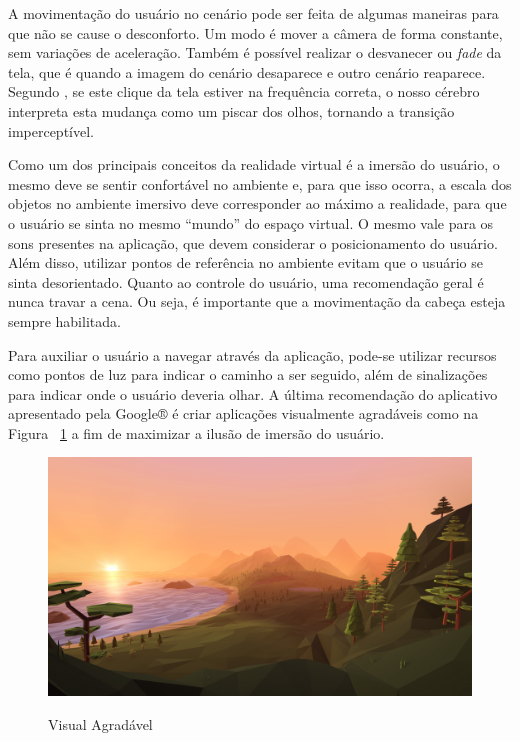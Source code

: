 A movimentação do usuário no cenário pode ser feita de algumas maneiras para que não se cause o desconforto. Um modo é mover a câmera de forma constante, sem variações de aceleração. Também é possível realizar o desvanecer ou \textit{fade} da tela, que é quando a imagem do cenário desaparece e outro cenário reaparece. Segundo , se este clique da tela estiver na frequência correta, o nosso cérebro interpreta esta mudança como um piscar dos olhos, tornando a transição imperceptível. 

Como um dos principais conceitos da realidade virtual é a imersão do usuário, o mesmo deve se sentir confortável no ambiente e, para que isso ocorra, a escala dos objetos no ambiente imersivo deve corresponder ao máximo a realidade, para que o usuário se sinta no mesmo “mundo” do espaço virtual. O mesmo vale para os sons presentes na aplicação, que devem considerar o posicionamento do usuário. Além disso, utilizar pontos de referência no ambiente evitam que o usuário se sinta desorientado. Quanto ao controle do usuário, uma recomendação geral é nunca travar a cena. Ou seja, é importante que a movimentação da cabeça esteja sempre habilitada.

Para auxiliar o usuário a navegar através da aplicação, pode-se utilizar recursos como pontos de luz para indicar o caminho a ser seguido, além de sinalizações para indicar onde o usuário deveria olhar. A última recomendação do aplicativo apresentado pela Google® é criar aplicações visualmente agradáveis como na Figura ~\ref{f.makeitbeatiful} a fim de maximizar a ilusão de imersão do usuário. 

\begin{figure}[h]
	\caption{\small Visual Agradável}
	\centering
	\includegraphics[scale=0.2]{Imagens/makeitbeautiful.png}
	\label{f.makeitbeatiful}
\end{figure}


